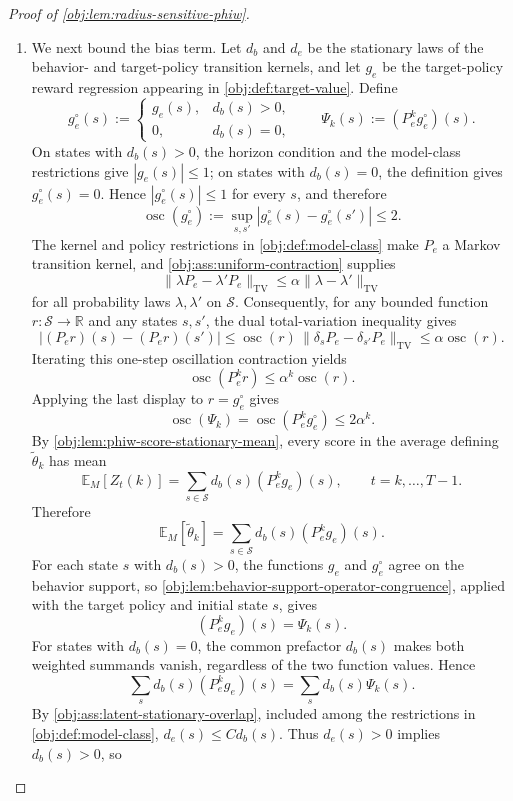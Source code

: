 \documentclass[11pt]{article}
\begin{document}
\begin{proof}[Proof of \cref{obj:lem:radius-sensitive-phiw}]
\begin{enumerate}
\item
We next bound the bias term.  Let \(d_b\) and \(d_e\) be the stationary laws of the behavior- and target-policy transition kernels, and let \(g_e\) be the target-policy reward regression appearing in \cref{obj:def:target-value}.  Define
\[
g_e^\circ(s)
:=
\begin{cases}
g_e(s), & d_b(s)>0,\\
0, & d_b(s)=0,
\end{cases}
\qquad
\Psi_k(s):=(P_e^k g_e^\circ)(s).
\]
On states with \(d_b(s)>0\), the horizon condition and the model-class restrictions give \(|g_e(s)|\le 1\); on states with \(d_b(s)=0\), the definition gives \(g_e^\circ(s)=0\).  Hence \(|g_e^\circ(s)|\le 1\) for every \(s\), and therefore
\[
\operatorname{osc}(g_e^\circ)
:=
\sup_{s,s'} |g_e^\circ(s)-g_e^\circ(s')|
\le 2.
\]
The kernel and policy restrictions in \cref{obj:def:model-class} make \(P_e\) a Markov transition kernel, and \cref{obj:ass:uniform-contraction} supplies
\[
\|\lambda P_e-\lambda' P_e\|_{\mathrm{TV}}
\le
\alpha\|\lambda-\lambda'\|_{\mathrm{TV}}
\]
for all probability laws \(\lambda,\lambda'\) on \(\mathcal S\).  Consequently, for any bounded function \(r:\mathcal S\to\mathbb R\) and any states \(s,s'\), the dual total-variation inequality gives
\[
\bigl|(P_e r)(s)-(P_e r)(s')\bigr|
\le
\operatorname{osc}(r)\,\|\delta_sP_e-\delta_{s'}P_e\|_{\mathrm{TV}}
\le
\alpha\operatorname{osc}(r).
\]
Iterating this one-step oscillation contraction yields
\[
\operatorname{osc}(P_e^k r)
\le
\alpha^k\operatorname{osc}(r).
\]
Applying the last display to \(r=g_e^\circ\) gives
\[
\operatorname{osc}(\Psi_k)
=
\operatorname{osc}(P_e^k g_e^\circ)
\le
2\alpha^k .
\]
By \cref{obj:lem:phiw-score-stationary-mean}, every score in the average defining \(\widetilde\theta_k\) has mean
\[
\mathbb E_M[Z_t(k)]
=
\sum_{s\in\mathcal S} d_b(s)(P_e^k g_e)(s),
\qquad t=k,\ldots,T-1.
\]
Therefore
\[
\mathbb E_M[\widetilde\theta_k]
=
\sum_{s\in\mathcal S} d_b(s)(P_e^k g_e)(s).
\]
For each state \(s\) with \(d_b(s)>0\), the functions \(g_e\) and \(g_e^\circ\) agree on the behavior support, so \cref{obj:lem:behavior-support-operator-congruence}, applied with the target policy and initial state \(s\), gives
\[
(P_e^k g_e)(s)=\Psi_k(s).
\]
For states with \(d_b(s)=0\), the common prefactor \(d_b(s)\) makes both weighted summands vanish, regardless of the two function values.  Hence
\[
\sum_s d_b(s)(P_e^k g_e)(s)
=
\sum_s d_b(s)\Psi_k(s).
\]
By \cref{obj:ass:latent-stationary-overlap}, included among the restrictions in \cref{obj:def:model-class}, \(d_e(s)\le C d_b(s)\).  Thus \(d_e(s)>0\) implies \(d_b(s)>0\), so

\end{enumerate}
\end{proof}
\end{document}
